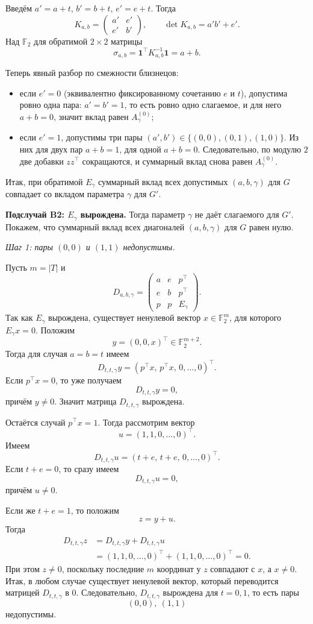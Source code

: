 \documentclass[12pt,a4paper]{article}
\begin{document}
Введём $a'=a+t$, $b'=b+t$, $e'=e+t$. Тогда
\[
K_{a,b}=\begin{pmatrix}a'&e'\\e'&b'\end{pmatrix},
\qquad
\det K_{a,b}=a'b'+e'.
\]
Над $\mathbb F_2$ для обратимой $2\times2$ матрицы
\[
\sigma_{a,b}=\mathbf 1^\top K_{a,b}^{-1}\mathbf 1=a+b.
\]

Теперь явный разбор по смежности близнецов:
\begin{itemize}
\item если $e'=0$ (эквивалентно фиксированному сочетанию $e$ и $t$), допустима ровно одна пара:
$a'=b'=1$, то есть ровно одно слагаемое, и для него $a+b=0$, значит вклад равен $A_\gamma^{(0)}$;
\item если $e'=1$, допустимы три пары $(a',b')\in\{(0,0),(0,1),(1,0)\}$.
Из них для двух пар $a+b=1$, для одной $a+b=0$.
Следовательно, по модулю $2$ две добавки $zz^\top$ сокращаются, и суммарный вклад снова равен
$A_\gamma^{(0)}$.
\end{itemize}
Итак, при обратимой $E_\gamma$ суммарный вклад всех допустимых $(a,b,\gamma)$ для $G$
совпадает со вкладом параметра $\gamma$ для $G'$.

\textbf{Подслучай B2: $E_\gamma$ вырождена.}
Тогда параметр $\gamma$ не даёт слагаемого для $G'$.
Покажем, что суммарный вклад всех диагоналей $(a,b,\gamma)$ для $G$ равен нулю.

\textit{Шаг 1: пары $(0,0)$ и $(1,1)$ недопустимы.}

Пусть $m=|T|$ и
\[
D_{a,b,\gamma}=
\begin{pmatrix}
a & e & p^\top\\
e & b & p^\top\\
p & p & E_\gamma
\end{pmatrix}.
\]
Так как $E_\gamma$ вырождена, существует ненулевой вектор $x\in\mathbb F_2^{m}$,
для которого $E_\gamma x=0$.
Положим
\[
y=(0,0,x)^\top\in\mathbb F_2^{m+2}.
\]
Тогда для случая $a=b=t$ имеем
\[
D_{t,t,\gamma}y=(p^\top x,\,p^\top x,\,0,\dots,0)^\top.
\]
Если $p^\top x=0$, то уже получаем
\[
D_{t,t,\gamma}y=0,
\]
причём $y\neq 0$. Значит матрица $D_{t,t,\gamma}$ вырождена.

Остаётся случай $p^\top x=1$. Тогда рассмотрим вектор
\[
u=(1,1,0,\dots,0)^\top.
\]
Имеем
\[
D_{t,t,\gamma}u=(t+e,\,t+e,\,0,\dots,0)^\top.
\]
Если $t+e=0$, то сразу имеем
\[
D_{t,t,\gamma}u=0,
\]
причём $u\neq 0$.

Если же $t+e=1$, то положим
\[
z=y+u.
\]
Тогда
\[
\begin{aligned}
D_{t,t,\gamma}z
&=D_{t,t,\gamma}y+D_{t,t,\gamma}u \\
&=(1,1,0,\dots,0)^\top+(1,1,0,\dots,0)^\top=0.
\end{aligned}
\]
При этом $z\neq 0$, поскольку последние $m$ координат у $z$ совпадают с $x$, а $x\neq 0$.
Итак, в любом случае существует ненулевой вектор, который переводится матрицей
$D_{t,t,\gamma}$ в 0.
Следовательно, $D_{t,t,\gamma}$ вырождена для $t=0,1$, то есть пары
\[
(0,0),\ (1,1)
\]
недопустимы.
\end{document}
